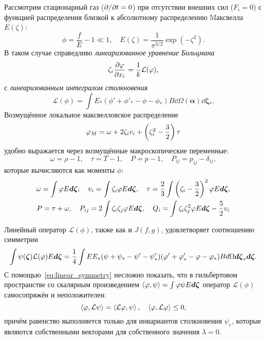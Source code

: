 Рассмотрим стационарный газ (\(\Pder{t}=0\)) при отсутствии внешних сил (\(F_i=0\))
с функцией распределения близкой к абсолютному распределению Mаксвелла \(E(\zeta)\):
\begin{equation}\label{eq:linear_condition}
    \phi = \frac{f}{E} - 1 \ll 1, \quad E(\zeta) = \frac1{\pi^{3/2}}\exp\left(-\zeta^2\right).
\end{equation}
В таком случае справедливо \emph{линеаризованное уравнение Больцмана}
\begin{equation}\label{eq:linear_Boltzmann}
    \zeta_i \pder[\phi]{x_i} = \frac1k \mathcal{L}(\phi),
\end{equation}
с \emph{линеаризованным интегралом столкновения}
\begin{equation}\label{eq:linear_ci}
    \mathcal{L}(\phi) = \int E_*(\phi'+\phi'_*-\phi-\phi_*) B
    \dd \Omega(\boldsymbol{\alpha}) \boldsymbol{\dd \zeta_*}.
\end{equation}
Возмущённое локальное максвелловское распределение
\begin{equation}\label{eq:linear_maxwellian}
    \phi_M = \omega + 2\Z v_i + \left(\Z^2-\frac32\right)\tau
\end{equation}
удобно выражается через возмущённые макроскопические переменные:
\begin{equation}\label{eq:linear_macro}
    \omega = \rho-1, \quad \tau = T-1, \quad P = p-1, \quad P_{ij} = p_{ij} - \delta_{ij},
\end{equation}
которые вычисляются как моменты \(\phi\):
\begin{gather}\label{eq:linear_macro_variables}
    \begin{gathered}
        \omega = \int \phi E\dzeta, \quad
        v_i = \int \Z \phi E\dzeta, \quad
        \tau = \frac23 \int \left( \Z-\frac32 \right)^2 \phi E\dzeta, \\
        P = \tau + \omega, \quad
        P_{ij} = 2\int \ZZ \phi E\dzeta, \quad
        Q_i = \int \ZZ^2 \phi E\dzeta - \frac52v_i
    \end{gathered}
\end{gather}

Линейный оператор \(\mathcal{L}(\phi)\), также как и \(J(f,g)\), удовлетворяет соотношению симметрии
\begin{equation}\label{eq:linear_symmetry}
    \int\psi(\bzeta)\mathcal{L}(\phi)E\dzeta = \frac14\int EE_* (\psi+\psi_*-\psi'-\psi'_*)
        (\phi'+\phi'_*-\phi-\phi_*) B\dd\Omega\dzeta_*\dzeta.
\end{equation}
С помощью~\eqref{eq:linear_symmetry} несложно показать, что в гильбертовом пространстве
со скалярным произведением \( \inner{\phi}{\psi} = \int\phi\psi E\dzeta\)
оператор \(\mathcal{L}(\phi)\) самосопряжён и неположителен:
\begin{equation}\label{eq:linear_properties}
    \inner{\phi}{\mathcal{L}\psi} = \inner{\mathcal{L}\phi}{\psi}, \quad
    \inner{\phi}{\mathcal{L}\phi} \leq 0,
\end{equation}
причём равенство выполняется только для инвариантов столкновения \(\psi_r\),
которые являются собственными векторами для собственного значения \(\lambda = 0\).

